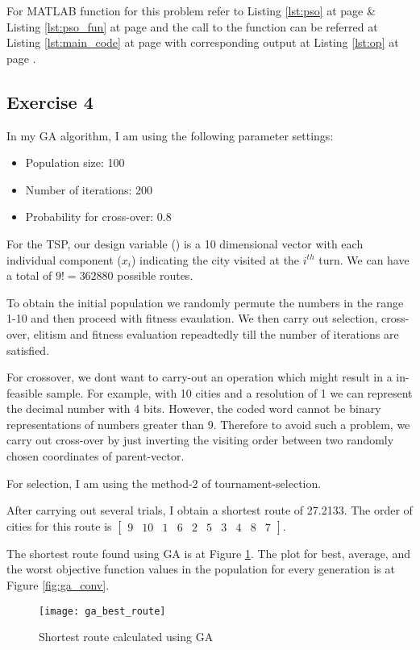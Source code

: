 \documentclass[11pt]{article}
\newcommand{\V}[1]{\pmb{#1}}
\newcommand{\mat}[1]{\begin{bmatrix}#1\end{bmatrix}}
\newcommand{\reflst}[1]{Listing \ref{#1} at page \pageref{#1}}
\newcommand{\reffig}[1]{Figure \ref{#1}}
\begin{document}
\noindent For MATLAB function for this problem refer to \reflst{lst:pso} \& \reflst{lst:pso_fun} and the call to the function can be referred at \reflst{lst:main_code} with corresponding output at \reflst{lst:op}.
%
\clearpage
\vspace{2ex}
\subsection*{Exercise 4} 
In my GA algorithm, I am using the following parameter settings:
\begin{itemize}
 \item Population size: 100
 \item Number of iterations: 200
 \item Probability for cross-over: 0.8
\end{itemize}

\noindent For the TSP, our design variable (\V{x}) is a 10 dimensional vector with each individual component ($x_i$) indicating the city visited at the $i^{th}$ turn. We can have a total of $9!=362880$ possible routes. 

\noindent To obtain the initial population we randomly permute the numbers in the range 1-10 and then proceed with fitness evaulation. We then carry out selection, cross-over, elitism and fitness evaluation repeadtedly till the number of iterations are satisfied. 

\noindent For crossover, we dont want to carry-out an operation which might result in a in-feasible sample. For example, with 10 cities and a resolution of 1 we can represent the decimal number with 4 bits. However, the coded word cannot be binary representations of numbers greater than 9. Therefore to avoid such a problem, we carry out cross-over by just inverting the visiting order between two randomly chosen coordinates of parent-vector.

\noindent For selection, I am using the method-2 of tournament-selection.

\noindent After carrying out several trials, I obtain a shortest route of 27.2133. The order of cities for this route is $\mat{ 9   & 10&     1&     6&     2&     5&     3&     4&     8&     7}$. 

\noindent The shortest route found using GA is at \reffig{fig:ga_route}. The plot for best, average, and the worst objective function values in the population for every generation is at \reffig{fig:ga_conv}.

\begin{figure}[!h]
  \centering
 \texttt{[image: ga\_best\_route]}
 \caption{Shortest route calculated using GA}
 \label{fig:ga_route}
\end{figure}
\end{document}
